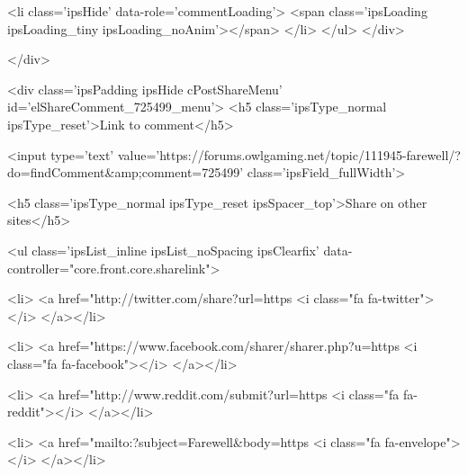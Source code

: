 						
						
					
					<li class='ipsHide' data-role='commentLoading'>
						<span class='ipsLoading ipsLoading_tiny ipsLoading_noAnim'></span>
					</li>
				</ul>
			</div>
		

		
			

		
	</div>

	

	



<div class='ipsPadding ipsHide cPostShareMenu' id='elShareComment_725499_menu'>
	<h5 class='ipsType_normal ipsType_reset'>Link to comment</h5>
	
		
	
	
	<input type='text' value='https://forums.owlgaming.net/topic/111945-farewell/?do=findComment&amp;comment=725499' class='ipsField_fullWidth'>

	
	<h5 class='ipsType_normal ipsType_reset ipsSpacer_top'>Share on other sites</h5>
	

	<ul class='ipsList_inline ipsList_noSpacing ipsClearfix' data-controller="core.front.core.sharelink">
		
			<li>
<a href="http://twitter.com/share?url=https%
	<i class="fa fa-twitter"></i>
</a></li>
		
			<li>
<a href="https://www.facebook.com/sharer/sharer.php?u=https%
	<i class="fa fa-facebook"></i>
</a></li>
		
			<li>
<a href="http://www.reddit.com/submit?url=https%
	<i class="fa fa-reddit"></i>
</a></li>
		
			<li>
<a href="mailto:?subject=Farewell&body=https%
	<i class="fa fa-envelope"></i>
</a></li>
		
